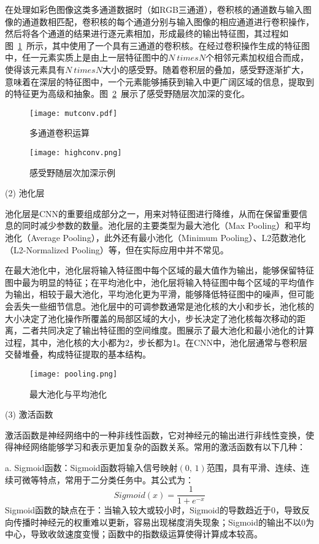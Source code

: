 在处理如彩色图像这类多通道数据时（如RGB三通道），卷积核的通道数与输入图像的通道数相匹配，卷积核的每个通道分别与输入图像的相应通道进行卷积操作，然后将各个通道的结果进行逐元素相加，形成最终的输出特征图，其过程如图~\ref{fig:mutconv}~所示，其中使用了一个具有三通道的卷积核。在经过卷积操作生成的特征图中，任一元素实质上是由上一层特征图中的\(N\ times N\)个相邻元素加权组合而成，使得该元素具有\(N\ times N\)大小的感受野。随着卷积层的叠加，感受野逐渐扩大，意味着在深层的特征图中，一个元素能够捕获到输入中更广阔区域的信息，提取到的特征更为高级和抽象。图~\ref{fig:highconv}~展示了感受野随层次加深的变化。
\begin{figure}
    \centering
    \texttt{[image: mutconv.pdf]}
    \caption{多通道卷积运算}
    \label{fig:mutconv}
\end{figure}
\begin{figure}
    \centering
    \texttt{[image: highconv.png]}
    \caption{感受野随层次加深示例}
    \label{fig:highconv}
\end{figure}

(2) 池化层

池化层是CNN的重要组成部分之一，用来对特征图进行降维，从而在保留重要信息的同时减少参数的数量。池化层的主要类型为最大池化（Max Pooling）和平均池化（Average Pooling），此外还有最小池化（Minimum Pooling）、L2范数池化（L2-Normalized Pooling）等，但在实际应用中并不常见。

在最大池化中，池化层将输入特征图中每个区域的最大值作为输出，能够保留特征图中最为明显的特征；在平均池化中，池化层将输入特征图中每个区域的平均值作为输出，相较于最大池化，平均池化更为平滑，能够降低特征图中的噪声，但可能会丢失一些细节信息。池化层中的可调参数通常是池化核的大小和步长，池化核的大小决定了池化操作所覆盖的局部区域的大小，步长决定了池化核每次移动的距离，二者共同决定了输出特征图的空间维度。图展示了最大池化和最小池化的计算过程，其中，池化核的大小都为2，步长都为1。在CNN中，池化层通常与卷积层交替堆叠，构成特征提取的基本结构。
\begin{figure}
    \centering
    \texttt{[image: pooling.png]}
    \caption{最大池化与平均池化}
    \label{fig:pooling}
\end{figure}

(3) 激活函数

激活函数是神经网络中的一种非线性函数，它对神经元的输出进行非线性变换，使得神经网络能够学习和表示更加复杂的函数关系。常用的激活函数有以下几种：

a. Sigmoid函数：Sigmoid函数将输入信号映射\((0,\,1)\)范围，具有平滑、连续、连续可微等特点，常用于二分类任务中。其公式为：
\begin{equation}
    Sigmoid(x) = \frac{1}{1 + e^{-x}}
    \label{eq:sigmoid}
\end{equation}
Sigmoid函数的缺点在于：当输入较大或较小时，Sigmoid的导数趋近于0，导致反向传播时神经元的权重难以更新，容易出现梯度消失现象；Sigmoid的输出不以0为中心，导致收敛速度变慢；函数中的指数级运算使得计算成本较高。

